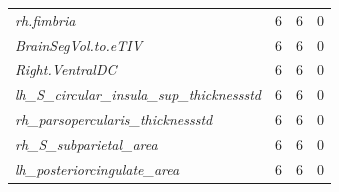\documentclass{article}
\begin{document}
\begin{table}[ht]
\begin{tabular}{llll}
\textit{rh.fimbria}                                 & 6             & 6             & 0             \\
\textit{BrainSegVol.to.eTIV}                        & 6             & 6             & 0             \\
\textit{Right.VentralDC}                            & 6             & 6             & 0             \\
\textit{lh\_S\_circular\_insula\_sup\_thicknessstd} & 6             & 6             & 0             \\
\textit{rh\_parsopercularis\_thicknessstd}          & 6             & 6             & 0             \\
\textit{rh\_S\_subparietal\_area}                   & 6             & 6             & 0             \\
\textit{lh\_posteriorcingulate\_area}               & 6             & 6             & 0
\end{tabular}
\end{table}

\newpage
\end{document}
